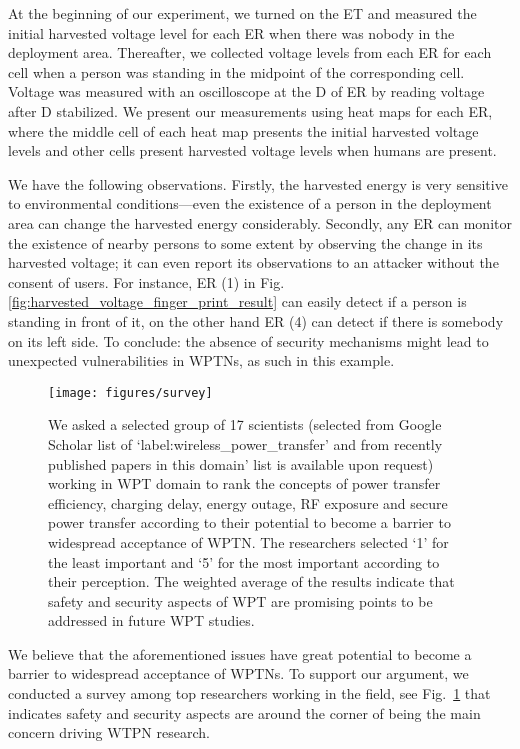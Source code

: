 \documentclass[journal,10pt,draftclsnofoot,onecolumn]{IEEEtran}
\begin{document}
At the beginning of our experiment, we turned on the ET and measured the initial harvested voltage level for each ER when there was nobody in the deployment area. Thereafter, we collected voltage levels from each ER for each cell when a person was standing in the midpoint of the corresponding cell. Voltage was measured with an oscilloscope at the D of ER by reading voltage after D stabilized. We present our measurements using heat maps for each ER, where the middle cell of each heat map presents the initial harvested voltage levels and other cells present harvested voltage levels when humans are present.

We have the following observations. Firstly, the harvested energy is very sensitive to environmental conditions---even the existence of a person in the deployment area can change the harvested energy considerably. Secondly, any ER can monitor the existence of nearby persons to some extent by observing the change in its harvested voltage; it can even report its observations to an attacker without the consent of users. For instance, ER (1) in Fig. \ref{fig:harvested_voltage_finger_print_result} can easily detect if a person is standing in front of it, on the other hand ER (4) can detect if there is somebody on its left side. To conclude: the absence of security mechanisms might lead to unexpected vulnerabilities in WPTNs, as such in this example.   

\begin{figure}
	\centering
	\texttt{[image: figures/survey]}
	\caption{\label{fig:survey} We asked a selected group of 17 scientists (selected from Google Scholar list of `label:wireless\_power\_transfer' and from recently published papers in this domain' list is available upon request) working in WPT domain to rank the concepts of power transfer efficiency, charging delay, energy outage, RF exposure and secure power transfer according to their potential to become a barrier to widespread acceptance of WPTN. The researchers selected `1' for the least important and `5' for the most important according to their perception. The weighted average of the results indicate that safety and security aspects of WPT are promising points to be addressed in future WPT studies.}
\end{figure}

We believe that the aforementioned issues have great potential to become a barrier to widespread acceptance of WPTNs. To support our argument, we conducted a survey among top researchers working in the field, see Fig.~\ref{fig:survey} that indicates safety and security aspects are around the corner of being the main concern driving WTPN research. 
\end{document}
